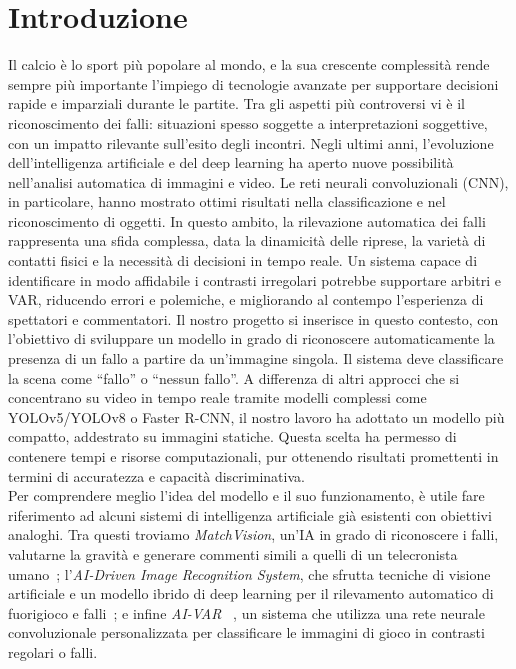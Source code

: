 \documentclass[main.tex]{subfiles}
\begin{document}
\section{Introduzione}\label{sec:introdution}
Il calcio è lo sport più popolare al mondo, e la sua crescente complessità rende sempre più importante l’impiego di tecnologie avanzate per supportare decisioni rapide e imparziali durante le partite. Tra gli aspetti più controversi vi è il riconoscimento dei falli: situazioni spesso soggette a interpretazioni soggettive, con un impatto rilevante sull’esito degli incontri.
Negli ultimi anni, l’evoluzione dell’intelligenza artificiale e del deep learning ha aperto nuove possibilità nell’analisi automatica di immagini e video. Le reti neurali convoluzionali (CNN), in particolare, hanno mostrato ottimi risultati nella classificazione e nel riconoscimento di oggetti. In questo ambito, la rilevazione automatica dei falli rappresenta una sfida complessa, data la dinamicità delle riprese, la varietà di contatti fisici e la necessità di decisioni in tempo reale. Un sistema capace di identificare in modo affidabile i contrasti irregolari potrebbe supportare arbitri e VAR, riducendo errori e polemiche, e migliorando al contempo l’esperienza di spettatori e commentatori.
Il nostro progetto si inserisce in questo contesto, con l’obiettivo di sviluppare un modello in grado di riconoscere automaticamente la presenza di un fallo a partire da un’immagine singola. Il sistema deve classificare la scena come “fallo” o “nessun fallo”.
A differenza di altri approcci che si concentrano su video in tempo reale tramite modelli complessi come YOLOv5/YOLOv8 o Faster R-CNN, il nostro lavoro ha adottato un modello più compatto, addestrato su immagini statiche. Questa scelta ha permesso di contenere tempi e risorse computazionali, pur ottenendo risultati promettenti in termini di accuratezza e capacità discriminativa.\\
\noindent
Per comprendere meglio l’idea del modello e il suo funzionamento, è utile fare riferimento ad alcuni sistemi di intelligenza artificiale già esistenti con obiettivi analoghi. Tra questi troviamo \textit{MatchVision}, un’IA in grado di riconoscere i falli, valutarne la gravità e generare commenti simili a quelli di un telecronista umano~\cite{matchvision2024}; l’\textit{AI-Driven Image Recognition System}, che sfrutta tecniche di visione artificiale e un modello ibrido di deep learning per il rilevamento automatico di fuorigioco e falli~\cite{Zhang2025}; e infine \textit{AI-VAR} ~\cite{ansari2021varcnn}, un sistema che utilizza una rete neurale convoluzionale personalizzata per classificare le immagini di gioco in contrasti regolari o falli.
\end{document}
